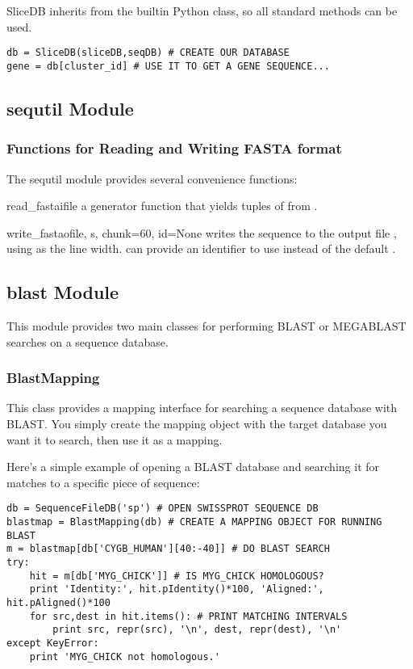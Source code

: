 \documentclass{howto}
\begin{document}
SliceDB inherits from the builtin Python  class,
so all standard methods can be used.

\begin{verbatim}
db = SliceDB(sliceDB,seqDB) # CREATE OUR DATABASE
gene = db[cluster_id] # USE IT TO GET A GENE SEQUENCE...
\end{verbatim}


\subsection{sequtil Module}
\subsubsection{Functions for Reading and Writing FASTA format}
The sequtil module provides several convenience functions:

\begin{funcdesc}{read_fasta}{ifile}
  a generator function
  that yields tuples of  from .  
\end{funcdesc}

\begin{funcdesc}{write_fasta}{ofile, s, chunk=60, id=None}
  writes the sequence 
  to the output file , using  as the line width.
   can provide an identifier to use instead of the default 
  .
\end{funcdesc}



\subsection{blast Module}
This module provides two main classes for performing BLAST or MEGABLAST
searches on a sequence database.

\subsubsection{BlastMapping}
This class provides a mapping interface for searching a sequence
database with BLAST.  You simply create the mapping object with the
target database you want it to search, then use it as a mapping.

Here's a simple example of opening a BLAST database and searching it for matches to a specific piece of sequence:

\begin{verbatim}
db = SequenceFileDB('sp') # OPEN SWISSPROT SEQUENCE DB
blastmap = BlastMapping(db) # CREATE A MAPPING OBJECT FOR RUNNING BLAST
m = blastmap[db['CYGB_HUMAN'][40:-40]] # DO BLAST SEARCH
try:
    hit = m[db['MYG_CHICK']] # IS MYG_CHICK HOMOLOGOUS?
    print 'Identity:', hit.pIdentity()*100, 'Aligned:', hit.pAligned()*100
    for src,dest in hit.items(): # PRINT MATCHING INTERVALS
        print src, repr(src), '\n', dest, repr(dest), '\n'
except KeyError:
    print 'MYG_CHICK not homologous.'
\end{verbatim}
\end{document}
